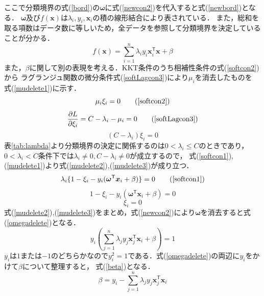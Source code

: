\documentclass[11pt,a4paper,titlepage]{ltjsarticle}
\begin{document}
ここで分類境界の式(\ref{bord})の$\bm{\omega}$に式(\ref{newcon2})を代入すると式(\ref{newbord})となる．
$\bm{\omega}$及び$f(\bm{x})$は$\lambda_i,y_i,\bm{x}_i$の積の線形結合により表されている．
また，総和を取る項数はデータ数に等しいため，全データを参照して分類境界を決定していることが分かる．
\begin{equation}
    \label{newbord}
    f(\bm{x}) = \sum_{i=1}^{n}\lambda_iy_i\bm{x}_i^\mathsf{T}\bm{x} + \beta
\end{equation}
また，$\beta$に関して別の表現を考える．KKT条件のうち相補性条件の式(\ref{softcon2})から
ラグランジュ関数の微分条件式(\ref{softLagcon3})により$\mu_i$を消去したものを
式(\ref{mudelete1})に示す．
\begin{equation}
    \mu_i\xi_i = 0 \tag{\ref{softcon2}}
\end{equation}
\begin{equation}
    \frac{\partial L}{\partial \xi_i} = C - \lambda_i - \mu_i = 0 \tag{\ref{softLagcon3}}
\end{equation}
\begin{equation}
    \label{mudelete1}
    (C-\lambda_i)\xi_i = 0
\end{equation}
表\ref{tab:lambda}より分類境界の決定に関係するのは$0<\lambda_i\leq C$のときであり，
$0<\lambda_i < C$条件下では$\lambda_i\neq0,C-\lambda_i \neq0$が成立するので，
式(\ref{softcon1}),(\ref{mudelete1})より式(\ref{mudelete2}),(\ref{mudelete3})が成り立つ．
\begin{equation}
    \lambda_i\{1-\xi_i-y_i(\bm{\omega}^\mathsf{T}\bm{x}_i+\beta)\} = 0  \tag{\ref{softcon1}}
\end{equation}
\begin{equation}
    \label{mudelete2}
    1-\xi_i-y_i(\bm{\omega}^\mathsf{T}\bm{x}_i+\beta) = 0 
\end{equation}
\begin{equation}
    \label{mudelete3}
    \xi_i = 0
\end{equation}
式(\ref{mudelete2}),(\ref{mudelete3})をまとめ，式(\ref{newcon2})により$\bm{\omega}$を消去すると式(\ref{omegadelete})となる．
\begin{equation}
    \label{omegadelete}
    y_i\left(\sum_{j=1}^{n}\lambda_jy_j\bm{x}_j^\mathsf{T}\bm{x}_i + \beta\right) = 1
\end{equation}
$y_i$は$1$または$-1$のどちらかなので$y_i^2=1$である．式(\ref{omegadelete})の両辺に$y_i$をかけて$\beta$について整理すると，
式(\ref{beta})となる．
\begin{equation}
    \label{beta}
    \beta = y_i - \sum_{j=1}^{n}\lambda_jy_j\bm{x}_j^\mathsf{T}\bm{x}_i
\end{equation}
\end{document}
